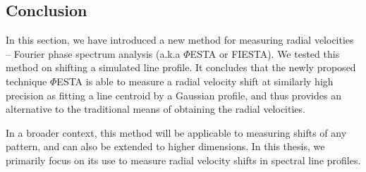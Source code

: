 \FloatBarrier

%
%


\subsection{Conclusion}
In this section, we have introduced a new method for measuring radial velocities -- Fourier phase spectrum analysis (a.k.a $\mathit{\Phi}$ESTA or FIESTA). We tested this method on shifting a simulated line profile. It concludes that the newly proposed technique $\mathit{\Phi}$ESTA is able to measure a radial velocity shift at similarly high precision as fitting a line centroid by a Gaussian profile, and thus provides an alternative to the traditional means of obtaining the radial velocities. 

In a broader context, this method will be applicable to measuring shifts of any pattern, and can also be extended to higher dimensions. In this thesis, we primarily focus on its use to measure radial velocity shifts in spectral line profiles.


\pagebreak

